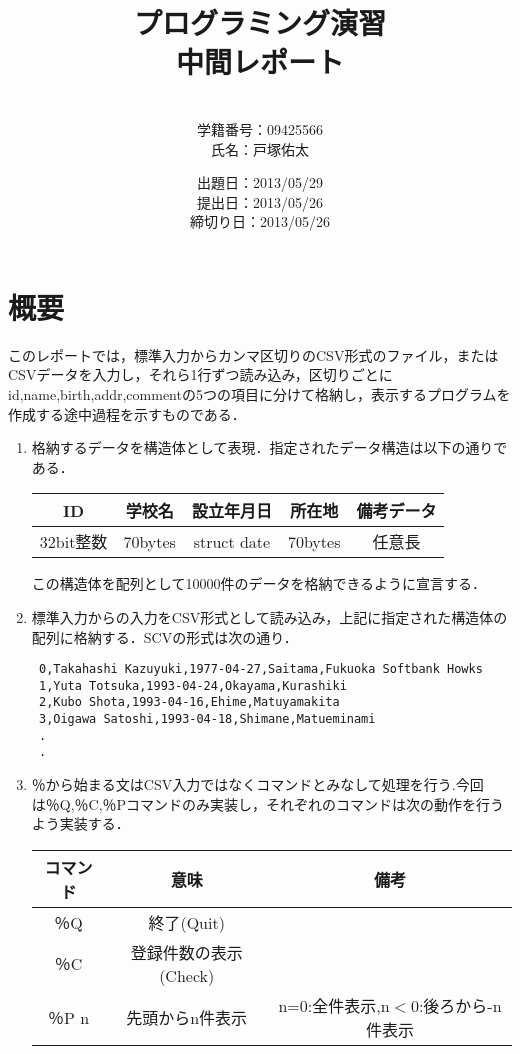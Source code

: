 \documentclass[a4j]{jarticle}
\title{プログラミング演習\\中間レポート}
\author{\\学籍番号：09425566\\氏名：戸塚佑太}
\date{出題日：2013/05/29\\提出日：2013/05/26\\締切り日：2013/05/26\\}
\begin{document}
\maketitle

\newpage


%
%

\section{概要}

このレポートでは，標準入力からカンマ区切りのCSV形式のファイル，またはCSVデータを入力し，それら1行ずつ読み込み，区切りごとにid,name,birth,addr,commentの5つの項目に分けて格納し，表示するプログラムを作成する途中過程を示すものである．

\begin{enumerate}
\item 格納するデータを構造体として表現．指定されたデータ構造は以下の通りである．

\begin{center}
\begin{tabular}{|c|c|c|c|c|}\hline
\centering
ID&学校名&設立年月日&所在地&備考データ\\\hline
32bit整数&70bytes&struct date&70bytes&任意長\\\hline
\end{tabular}
\end{center}

この構造体を配列として10000件のデータを格納できるように宣言する．

\item 標準入力からの入力をCSV形式として読み込み，上記に指定された構造体の配列に格納する．SCVの形式は次の通り．

{\baselineskip 3mm
\begin{verbatim}
 0,Takahashi Kazuyuki,1977-04-27,Saitama,Fukuoka Softbank Howks
 1,Yuta Totsuka,1993-04-24,Okayama,Kurashiki
 2,Kubo Shota,1993-04-16,Ehime,Matuyamakita
 3,Oigawa Satoshi,1993-04-18,Shimane,Matueminami
 .
 .
\end{verbatim}
}

\item ％から始まる文はCSV入力ではなくコマンドとみなして処理を行う.今回は％Q,％C,％Pコマンドのみ実装し，それぞれのコマンドは次の動作を行うよう実装する．

\begin{center}
\begin{tabular}{|c|c|c|}\hline
コマンド&意味&備考\\ \hline
％Q&終了(Quit)&\\ \hline
％C&登録件数の表示(Check)&\\ \hline
％P n&先頭からn件表示&n=0:全件表示,n$<$0:後ろから-n件表示\\ \hline
\end{tabular}
\end{center}

\end{enumerate}
\end{document}
